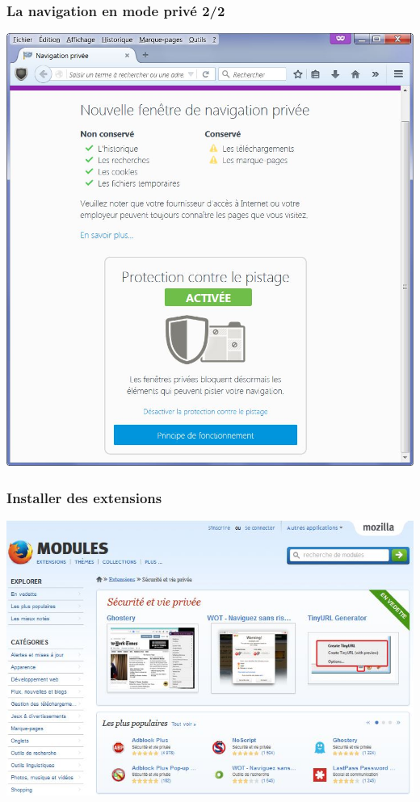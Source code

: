 \documentclass{beamer}
\begin{document}
\begin{frame}
\frametitle{La navigation en mode privé 2/2}
\begin{center}
\includegraphics[scale=0.5] {./images/Navigation_privee.jpg} 
\end{center}
\end{frame}

\begin{frame}
\frametitle{Installer des extensions}
\begin{center}
\includegraphics[scale=0.75] {./images/extensions_firefox.jpg}
\end{center}
\end{frame}
\end{document}
